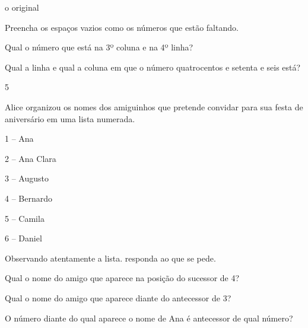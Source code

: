\begin{escolha}
\Consultar o original

\begin{escolha}
\item
  Preencha os espaços vazios como os números que estão faltando.

\item
  Qual o número que está na 3º coluna e na 4º linha?


\item
  Qual a linha e qual a coluna em que o número quatrocentos e setenta e seis está?

\end{escolha}

\num{5}

Alice organizou os nomes dos amiguinhos que pretende convidar para sua
festa de aniversário em uma lista numerada.


1 -- Ana

2 -- Ana Clara

3 -- Augusto

4 -- Bernardo

5 -- Camila

6 -- Daniel

Observando atentamente a lista. responda ao que se pede.

\begin{escolha}

\item
  Qual o nome do amigo que aparece na posição do sucessor de 4?

\item
  Qual o nome do amigo que aparece diante do antecessor de 3?

\item
  O número diante do qual aparece o nome de Ana é antecessor de qual número?

\end{escolha}


\end{escolha}
